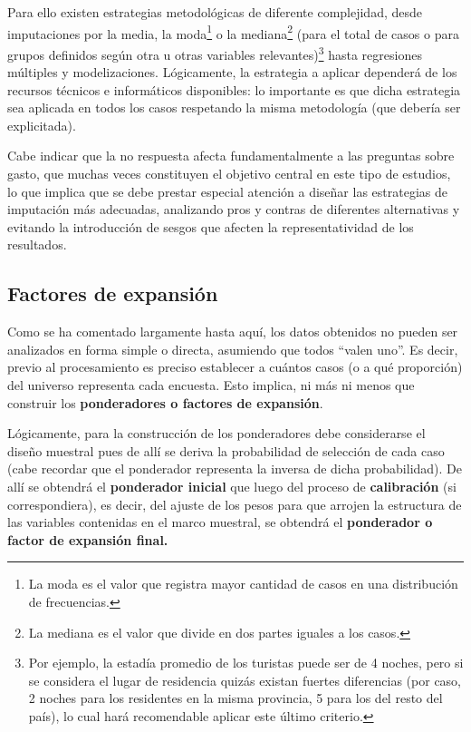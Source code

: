 \documentclass[
]{book}
\begin{document}
Para ello existen estrategias metodológicas de diferente complejidad, desde imputaciones por la media, la moda\footnote{La moda es el valor que registra mayor cantidad de casos en una distribución de frecuencias.} o la mediana\footnote{La mediana es el valor que divide en dos partes iguales a los casos.} (para el total de casos o para grupos definidos según otra u otras variables relevantes)\footnote{Por ejemplo, la estadía promedio de los turistas puede ser de 4 noches, pero si se considera el lugar de residencia quizás existan fuertes diferencias (por caso, 2 noches para los residentes en la misma provincia, 5 para los del resto del país), lo cual hará recomendable aplicar este último criterio.} hasta regresiones múltiples y modelizaciones. Lógicamente, la estrategia a aplicar dependerá de los recursos técnicos e informáticos disponibles: lo importante es que dicha estrategia sea aplicada en todos los casos respetando la misma metodología (que debería ser explicitada).

Cabe indicar que la no respuesta afecta fundamentalmente a las preguntas sobre gasto, que muchas veces constituyen el objetivo central en este tipo de estudios, lo que implica que se debe prestar especial atención a diseñar las estrategias de imputación más adecuadas, analizando pros y contras de diferentes alternativas y evitando la introducción de sesgos que afecten la representatividad de los resultados.

\hypertarget{factores-de-expansiuxf3n}{%
\subsection{Factores de expansión}\label{factores-de-expansiuxf3n}}

Como se ha comentado largamente hasta aquí, los datos obtenidos no pueden ser analizados en forma simple o directa, asumiendo que todos ``valen uno''. Es decir, previo al procesamiento es preciso establecer a cuántos casos (o a qué proporción) del universo representa cada encuesta. Esto implica, ni más ni menos que construir los \textbf{ponderadores o factores de expansión}.

Lógicamente, para la construcción de los ponderadores debe considerarse el diseño muestral pues de allí se deriva la probabilidad de selección de cada caso (cabe recordar que el ponderador representa la inversa de dicha probabilidad). De allí se obtendrá el \textbf{ponderador inicial} que luego del proceso de \textbf{calibración} (si correspondiera), es decir, del ajuste de los pesos para que arrojen la estructura de las variables contenidas en el marco muestral, se obtendrá el \textbf{ponderador o factor de expansión final.}
\end{document}
